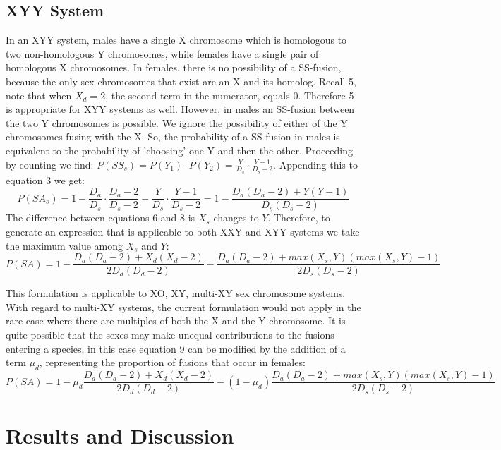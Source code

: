 \documentclass[12pt]{article}
\begin{document}
\subsection{XYY System}
In an XYY system, males have a single X chromosome which is homologous to two non-homologous Y chromosomes, while females have a single pair of homologous X chromosomes.
In females, there is no possibility of a SS-fusion, because the only sex chromosomes that exist are an X and its homolog. 
Recall 5, note that when $X_d = 2 $, the second term in the numerator, equals 0. 
Therefore 5 is appropriate for XYY systems as well.
However, in males an SS-fusion between the two Y chromosomes is possible.
We ignore the possibility of either of the Y chromosomes fusing with the X.
So, the probability of a SS-fusion in males is equivalent to the probability of 'choosing' one Y and then the other. 
Proceeding by counting we find: $ P(SS_s) = P(Y_1) \cdot P(Y_2) = \frac{Y}{D_s} \cdot \frac{Y - 1}{D_s - 2}$. 
Appending this to equation 3 we get:
    \begin{equation}
        P(SA_s) = 1 - \frac{D_a}{D_s} \cdot \frac{D_a - 2}{D_s - 2} - \frac{Y}{D_s} \cdot \frac{Y - 1}{D_s - 2} = 1 - \frac{D_a(D_a - 2) + Y(Y - 1)}{D_s(D_s - 2)}
    \end{equation}
The difference between equations 6 and 8 is $X_s$ changes to $Y$. 
Therefore, to generate an expression that is applicable to both XXY and XYY systems we take the maximum value among $X_s$ and $Y$:
    \begin{equation}
        P(SA) = 1 -\frac{D_a(D_a-2) + X_d(X_d-2)}{2D_d(D_d-2)} - \frac{D_a(D_a - 2) + max(X_s,Y)(max(X_s,Y)-1)}{2D_s(D_s-2)}
    \end{equation}

This formulation is applicable to XO, XY, multi-XY sex chromosome systems.
With regard to multi-XY systems, the current formulation would not apply in the rare case where there are multiples of both the X and the Y chromosome.
It is quite possible that the sexes may make unequal contributions to the fusions entering a species, in this case equation 9 can be modified by the addition of a term $\mu_d$, representing the proportion of fusions that occur in females: 
    \begin{equation}
        P(SA) = 1 -\mu_d\frac{D_a(D_a-2) + X_d(X_d-2)}{2D_d(D_d-2)} - (1-\mu_d)\frac{D_a(D_a - 2) + max(X_s,Y)(max(X_s,Y)-1)}{2D_s(D_s-2)}
    \end{equation}

\section{Results and Discussion}
\end{document}
